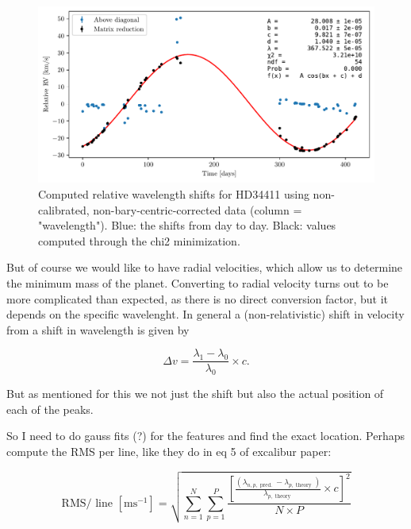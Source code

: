     \begin{figure}%
        \begin{wide}  
            \includegraphics[width=\textwidth]{figures/shift_non_bary_centric.pdf}
            \caption{Computed relative wavelength shifts for HD34411 using non-calibrated, non-bary-centric-corrected data (column = "wavelength"). Blue: the shifts from day to day. Black: values computed through the chi2 minimization.}
            \label{fig:shift_non_bary_centric}
        \end{wide}
    \end{figure}
    
    But of course we would like to have radial velocities, which allow us to determine the minimum mass of the planet.
    Converting to radial velocity turns out to be more complicated than expected, as there is no direct conversion factor, but it depends on the specific wavelenght. In general a (non-relativistic) shift in velocity from a shift in wavelength is given by

    \begin{equation}
        \label{eq:delta_velocity}
        \Delta v = \frac{\lambda_1 - \lambda_0}{\lambda_0} \times c.
    \end{equation}

    But as mentioned for this we not just the shift but also the actual position of each of the peaks. 

    \todo{} So I need to do gauss fits (?) for the features and find the exact location. Perhaps compute the RMS per line, like they do in eq 5 of excalibur paper:

    $$
        \mathrm{RMS} / \text { line }\left[\mathrm{m} \mathrm{s}^{-1}\right]=\sqrt{\sum_{n=1}^{N} \sum_{p=1}^{P} \frac{\left[\frac{\left(\lambda_{n, p, \text { pred. }}-\lambda_{p, \text { theory }}\right)}{\lambda_{p, \text { theory }}} \times c\right]^{2}}{N \times P}}
    $$




